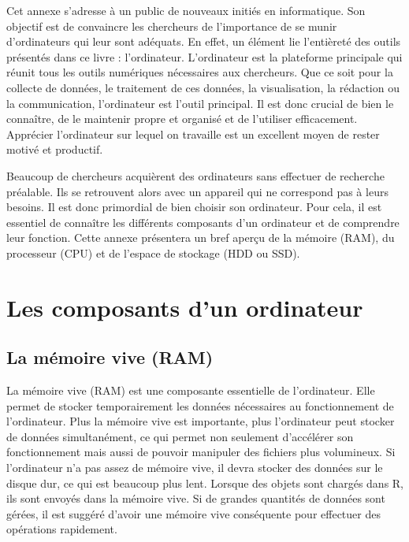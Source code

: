 \documentclass[
  letterpaper,
  DIV=11,
  numbers=noendperiod,
  oneside]{scrreprt}
\begin{document}
Cet annexe s'adresse à un public de nouveaux initiés en informatique.
Son objectif est de convaincre les chercheurs de l'importance de se
munir d'ordinateurs qui leur sont adéquats. En effet, un élément lie
l'entièreté des outils présentés dans ce livre : l'ordinateur.
L'ordinateur est la plateforme principale qui réunit tous les outils
numériques nécessaires aux chercheurs. Que ce soit pour la collecte de
données, le traitement de ces données, la visualisation, la rédaction ou
la communication, l'ordinateur est l'outil principal. Il est donc
crucial de bien le connaître, de le maintenir propre et organisé et de
l'utiliser efficacement. Apprécier l'ordinateur sur lequel on travaille
est un excellent moyen de rester motivé et productif.

Beaucoup de chercheurs acquièrent des ordinateurs sans effectuer de
recherche préalable. Ils se retrouvent alors avec un appareil qui ne
correspond pas à leurs besoins. Il est donc primordial de bien choisir
son ordinateur. Pour cela, il est essentiel de connaître les différents
composants d'un ordinateur et de comprendre leur fonction. Cette annexe
présentera un bref aperçu de la mémoire (RAM), du processeur (CPU) et de
l'espace de stockage (HDD ou SSD).

\hypertarget{les-composants-dun-ordinateur}{%
\section{Les composants d'un
ordinateur}\label{les-composants-dun-ordinateur}}

\hypertarget{la-muxe9moire-vive-ram}{%
\subsection{La mémoire vive (RAM)}\label{la-muxe9moire-vive-ram}}

La mémoire vive (RAM) est une composante essentielle de l'ordinateur.
Elle permet de stocker temporairement les données nécessaires au
fonctionnement de l'ordinateur. Plus la mémoire vive est importante,
plus l'ordinateur peut stocker de données simultanément, ce qui permet
non seulement d'accélérer son fonctionnement mais aussi de pouvoir
manipuler des fichiers plus volumineux. Si l'ordinateur n'a pas assez de
mémoire vive, il devra stocker des données sur le disque dur, ce qui est
beaucoup plus lent. Lorsque des objets sont chargés dans R, ils sont
envoyés dans la mémoire vive. Si de grandes quantités de données sont
gérées, il est suggéré d'avoir une mémoire vive conséquente pour
effectuer des opérations rapidement.
\end{document}
